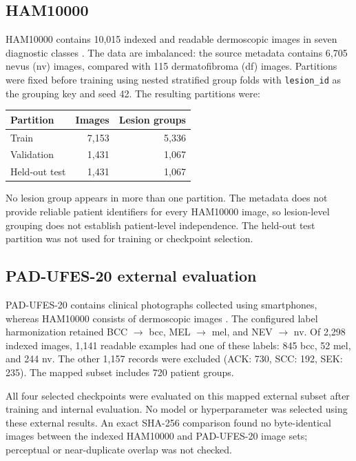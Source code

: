 \documentclass[11pt]{article}
\begin{document}
\subsection{HAM10000}

HAM10000 contains 10,015 indexed and readable dermoscopic images in seven diagnostic classes \cite{tschandl2018}. The data are imbalanced: the source metadata contains 6,705 nevus (nv) images, compared with 115 dermatofibroma (df) images. Partitions were fixed before training using nested stratified group folds with \texttt{lesion\_id} as the grouping key and seed 42. The resulting partitions were:

\begin{center}
\begin{tabular}{lrr}
\toprule
Partition & Images & Lesion groups\\
\midrule
Train & 7,153 & 5,336\\
Validation & 1,431 & 1,067\\
Held-out test & 1,431 & 1,067\\
\bottomrule
\end{tabular}
\end{center}

No lesion group appears in more than one partition. The metadata does not provide reliable patient identifiers for every HAM10000 image, so lesion-level grouping does not establish patient-level independence. The held-out test partition was not used for training or checkpoint selection.

\subsection{PAD-UFES-20 external evaluation}

PAD-UFES-20 contains clinical photographs collected using smartphones, whereas HAM10000 consists of dermoscopic images \cite{pacheco2020}. The configured label harmonization retained BCC $\rightarrow$ bcc, MEL $\rightarrow$ mel, and NEV $\rightarrow$ nv. Of 2,298 indexed images, 1,141 readable examples had one of these labels: 845 bcc, 52 mel, and 244 nv. The other 1,157 records were excluded (ACK: 730, SCC: 192, SEK: 235). The mapped subset includes 720 patient groups.

All four selected checkpoints were evaluated on this mapped external subset after training and internal evaluation. No model or hyperparameter was selected using these external results. An exact SHA-256 comparison found no byte-identical images between the indexed HAM10000 and PAD-UFES-20 image sets; perceptual or near-duplicate overlap was not checked.
\end{document}
